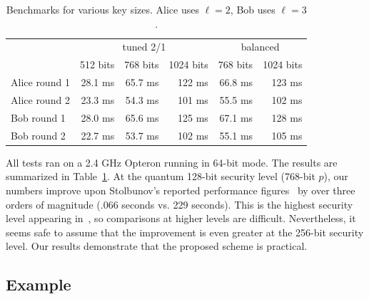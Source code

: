 \begin{table}[t]
  \centering
  \caption{Benchmarks for various key sizes. Alice uses $\ell=2$, Bob uses $\ell=3$.}
  \label{tab:benchs}
  \begin{tabular}{l | r r r | r r }
    \hline
    & \multicolumn{3}{c|}{tuned 2/1} & \multicolumn{2}{c}{balanced} \\
    & 512 bits & 768 bits & 1024 bits & 768 bits & 1024 bits \\
    \hline
    Alice round 1 & 28.1 ms & 65.7 ms & 122 ms & 66.8 ms & 123 ms \\
    Alice round 2 & 23.3 ms & 54.3 ms & 101 ms & 55.5 ms & 102 ms \\
    Bob round 1   & 28.0 ms & 65.6 ms & 125 ms & 67.1 ms & 128 ms \\
    Bob round 2   & 22.7 ms & 53.7 ms & 102 ms & 55.1 ms & 105 ms \\
    \hline
  \end{tabular}
\end{table}

All tests ran on a 2.4 GHz Opteron running in 64-bit mode. The results
are summarized in Table~\ref{tab:benchs}.  At the quantum 128-bit
security level (768-bit $p$), our numbers improve upon Stolbunov's
reported performance figures~\cite[Table 1]{Stol} by over three orders
of magnitude (.066 seconds vs. 229 seconds).  This is the highest
security level appearing in~\cite[Table 1]{Stol}, so comparisons at
higher levels are difficult. Nevertheless, it seems safe to assume
that the improvement is even greater at the 256-bit security
level. Our results demonstrate that the proposed scheme is practical.

\subsection{Example}\label{sec:ex}

